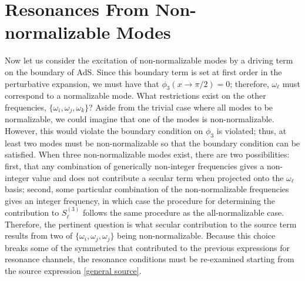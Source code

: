 \documentclass[letterpaper,11pt]{article}
\newcommand{\oi}{\omega_i}
\newcommand{\oj}{\omega_j}
\newcommand{\ok}{\omega_k}
\begin{document}

\section{Resonances From Non-normalizable Modes}
\label{sec: NNmodes}

Now let us consider the excitation of non-normalizable modes by a driving term on the boundary of AdS. Since this boundary term is set at first order in the perturbative expansion, we must have that $\phi_3 (x \to \pi/2) = 0$; therefore, $\omega_\ell$ must correspond to a normalizable mode. What restrictions exist on the other frequencies, $\{ \oi, \oj, \ok \}$? Aside from the trivial case where all modes to be normalizable, we could imagine that one of the modes is non-normalizable. However, this would violate the boundary condition on $\phi_3$ is violated; thus, at least two modes must be non-normalizable so that the boundary condition can be satisfied. When three non-normalizable modes exist, there are two possibilities: first, that any combination of generically non-integer frequencies gives a non-integer value and does not contribute a secular term when projected onto the $\omega_\ell$ basis; second, some particular combination of the non-normalizable frequencies gives an integer frequency, in which case the procedure for determining the contribution to $S^{(3)}_\ell$ follows the same procedure as the all-normalizable case. Therefore, the pertinent question is what secular contribution to the source term results from two of $\{\oi, \oj, \oj\}$ being non-normalizable. Because this choice breaks some of the symmetries that contributed to the previous expressions for resonance channels, the resonance conditions must be re-examined starting from the source expression \eqref{general source}.
\end{document}
